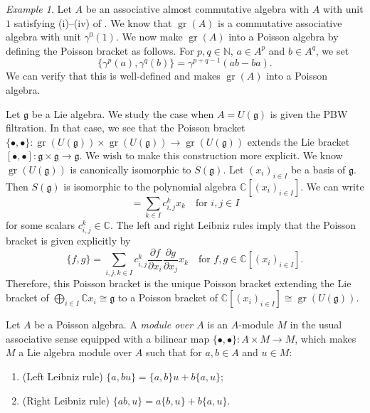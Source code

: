 \documentclass[a4paper, 12pt, reqno]{amsart}
\theoremstyle{remark}
\newtheorem{example}[theorem]{Example}
\DeclareMathOperator{\gr}{gr}
\begin{document}
\begin{example}
  \label{exa:18}
  Let $A$ be an associative almost commutative algebra with $A$ with unit $1$ satisfying (i)--(iv) of .
  We know that $\gr(A)$ is a commutative associative algebra with unit $\gamma^0(1)$.
  We now make $\gr(A)$ into a Poisson algebra by defining the Poisson bracket as follows.
  For $p, q \in \mathbb{N}$, $a \in A^p$ and $b \in A^q$, we set
  \begin{equation*}
    \{\gamma^p(a), \gamma^q(b)\} = \gamma^{p + q - 1}(ab - ba).
  \end{equation*}
  We can verify that this is well-defined and makes $\gr(A)$ into a Poisson algebra.

  Let $\mathfrak{g}$ be a Lie algebra.
  We study the case when $A = U(\mathfrak{g})$ is given the PBW filtration.
  In that case, we see that the Poisson bracket $\{\bullet, \bullet\}: \gr(U(\mathfrak{g})) \times \gr(U(\mathfrak{g})) \to \gr(U(\mathfrak{g}))$ extends the Lie bracket $[\bullet, \bullet]: \mathfrak{g} \times \mathfrak{g} \to \mathfrak{g}$.
  We wish to make this construction more explicit.
  We know $\gr(U(\mathfrak{g}))$ is canonically isomorphic to $S(\mathfrak{g})$.
  Let $(x_i)_{i \in I}$ be a basis of $\mathfrak{g}$.
  Then $S(\mathfrak{g})$ is isomorphic to the polynomial algebra $\mathbb{C}[(x_i)_{i \in I}]$.
  We can write
  \begin{equation*}
    [x_i, x_j] = \sum_{k \in I}c^k_{i, j}x_k \quad \text{for $i, j \in I$}
  \end{equation*}
  for some scalars $c^k_{i, j} \in \mathbb{C}$.
  The left and right Leibniz rules imply that the Poisson bracket is given explicitly by
  \begin{equation*}
    \{f, g\} = \sum_{i, j, k \in I}c^k_{i, j}\frac{\partial f}{\partial x_i}\frac{\partial g}{\partial x_j}x_k \quad \text{for $f, g \in \mathbb{C}[(x_i)_{i \in I}]$}.
  \end{equation*}
  Therefore, this Poisson bracket is the unique Poisson bracket extending the Lie bracket of $\bigoplus_{i \in I}\mathbb{C}x_i \cong \mathfrak{g}$ to a Poisson bracket of $\mathbb{C}[(x_i)_{i \in I}] \cong \gr(U(\mathfrak{g}))$.
\end{example}

Let $A$ be a Poisson algebra.
A \emph{module over $A$} is an $A$-module $M$ in the usual associative sense equipped with a bilinear map $\{\bullet, \bullet\}: A \times M \to M$, which makes $M$ a Lie algebra module over $A$ such that for $a, b \in A$ and $u \in M$:
\begin{enumerate}
\item (Left Leibniz rule) $\{a, bu\} = \{a, b\}u + b\{a, u\}$;
\item (Right Leibniz rule) $\{ab, u\} = a\{b, u\} + b\{a, u\}$.
\end{enumerate}
\end{document}
